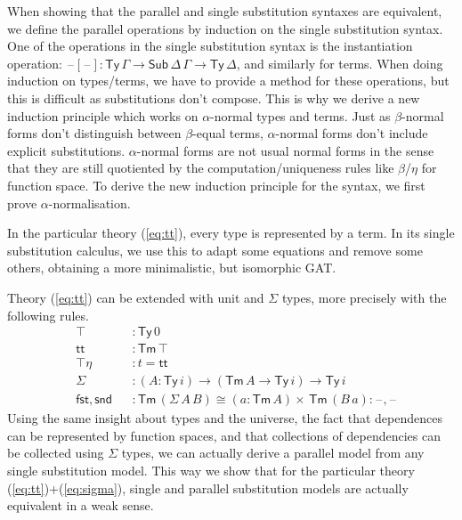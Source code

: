 \documentclass[sigplan,10pt,anonymous,review]{acmart}\settopmatter{printfolios=true,printccs=false,printacmref=false}
\newcommand{\ra}{\rightarrow}
\newcommand{\Ty}{\mathsf{Ty}}
\newcommand{\Tm}{\mathsf{Tm}}
\newcommand{\Sub}{\mathsf{Sub}}
\newcommand{\blank}{\mathord{\hspace{1pt}\text{--}\hspace{1pt}}} %
\renewcommand{\tt}{\mathsf{tt}}
\newcommand{\fst}{\mathsf{fst}}
\newcommand{\snd}{\mathsf{snd}}
\begin{document}
When showing that the parallel and single substitution syntaxes are
equivalent, we define the parallel operations by induction on the
single substitution syntax. One of the operations in the single
substitution syntax is the instantiation operation: $\blank[\blank] :
\Ty\,\Gamma\ra\Sub\,\Delta\,\Gamma\ra\Ty\,\Delta$, and similarly for
terms. When doing induction on types/terms, we have to provide
a method for these operations, but this is difficult as
substitutions don't compose. This is why we derive a new induction
principle which works on $\alpha$-normal types and terms. Just as
$\beta$-normal forms don't distinguish between $\beta$-equal terms,
$\alpha$-normal forms don't include explicit substitutions.
$\alpha$-normal forms are not usual normal
forms in the sense that they are still quotiented by the
computation/uniqueness rules like $\beta$/$\eta$ for function
space. To derive the new induction principle for the syntax, we first
prove $\alpha$-normalisation.

In the particular theory (\ref{eq:tt}), every type is represented by a
term. In its single substitution calculus, we use this to adapt some
equations and remove some others, obtaining a more minimalistic, but
isomorphic GAT.

Theory (\ref{eq:tt}) can be extended
with unit and $\Sigma$ types, more precisely with the following rules.
\begin{equation}\label{eq:sigma}
  \begin{alignedat}{10}
    & \top && : \Ty\,0 \\
    & \tt && : \Tm\,\top \\
    & \top\eta && : t = \tt \\
    & \Sigma && : (A:\Ty\,i)\ra(\Tm\,A\ra\Ty\,i)\ra\Ty\,i \\
    & \fst,\snd && : \Tm\,(\Sigma\,A\,B)\cong(a:\Tm\,A)\times\,\Tm\,(B\,a): \blank,\blank
\end{alignedat}
\end{equation}
Using the same insight about types and the universe, the fact that
dependences can be represented by function spaces, and that
collections of dependencies can be collected using $\Sigma$ types, we
can actually derive a parallel model from any single substitution
model. This way we show that for the particular theory (\ref{eq:tt})+(\ref{eq:sigma}),
single and parallel substitution models are actually equivalent in a
weak sense.
\end{document}
